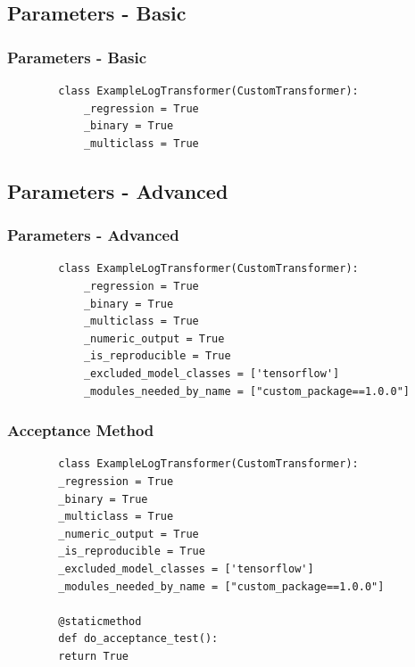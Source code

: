 \documentclass[11pt,
               aspectratio=169,
               hyperref={colorlinks}
               ]{beamer}
\begin{document}
		\subsection{Parameters - Basic}
	\begin{frame}[fragile]
		\frametitle{Parameters - Basic}
		\begin{verbatim}
		class ExampleLogTransformer(CustomTransformer):
			_regression = True
			_binary = True
			_multiclass = True
		\end{verbatim}
			
\end{frame}
		\subsection{Parameters - Advanced}
	\begin{frame}[fragile]
		\frametitle{Parameters - Advanced}
		\begin{verbatim}
		class ExampleLogTransformer(CustomTransformer):
			_regression = True
			_binary = True
			_multiclass = True
			_numeric_output = True
			_is_reproducible = True
			_excluded_model_classes = ['tensorflow']
			_modules_needed_by_name = ["custom_package==1.0.0"]
		\end{verbatim}
			
\end{frame}
	\begin{frame}[fragile]
		\frametitle{Acceptance Method}
		\begin{verbatim}
		class ExampleLogTransformer(CustomTransformer):
		_regression = True
		_binary = True
		_multiclass = True
		_numeric_output = True
		_is_reproducible = True
		_excluded_model_classes = ['tensorflow']
		_modules_needed_by_name = ["custom_package==1.0.0"]
	
		@staticmethod
		def do_acceptance_test():
		return True
		\end{verbatim}
			
\end{frame}
\end{document}
